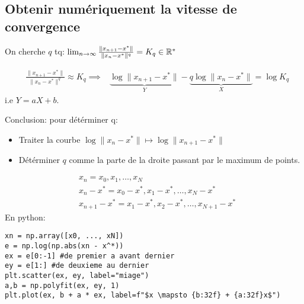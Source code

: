 \documentclass[a4paper]{report}
\begin{document}
\subsection{Obtenir numériquement la vitesse de convergence}
On cherche $q$ tq:  $\lim_{n \to \infty} \frac{\|x_{n+1} - x^*\|}{\|x_n - x^*\|^q} = K_q \in  \mathbb{R}^*$
\begin{remark}
    \begin{align*}
        &\frac{\|x_{n+1} - x^*\|}{\|x_n - x^*\|^q} \approx K_q
        \implies& \underbrace{ \log \|x_{n+1} - x^*\|  }_{Y} - \underbrace{q \log\|x_n - x^*\|}_{X} = \log K_q
    \end{align*}
    i.e $Y = aX + b$. 
    \par
    Conclusion: pour détérminer q:
     \begin{itemize}
        \item Traiter la courbe $\log\|x_n - x^*\| \mapsto \log\|x_{n+1} - x^*\|$
        \item Détérminer $q$ comme la parte de la droite passant par le maximum de points.
    \end{itemize}
\end{remark}
\begin{align*}
    &x_n = x_0, x_1, \ldots, x_N\\
    &x_n - x^* = x_0 - x^*, x_1 - x^*, \ldots, x_N - x^*\\
    &x_{n+1} - x^* = x_1 - x^*, x_2 - x^*, \ldots, x_{N+1} - x^*
\end{align*}
En python:

\begin{lstlisting}
xn = np.array([x0, ..., xN])
e = np.log(np.abs(xn - x^*))
ex = e[0:-1] #de premier a avant dernier
ey = e[1:] #de deuxieme au dernier
plt.scatter(ex, ey, label="miage")
a,b = np.polyfit(ex, ey, 1)
plt.plot(ex, b + a * ex, label=f"$x \mapsto {b:32f} + {a:32f}x$")
\end{lstlisting}
\end{document}
